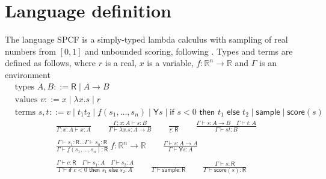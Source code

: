 \documentclass{article}
\newcommand{\tY}{\textsf{Y}}
\newcommand{\tif}[3]{\textsf{if }#1\textsf{ then }#2\textsf{ else }#3}
\newcommand{\tsample}{\textsf{sample}}
\newcommand{\tscore}{\textsf{score}}
\begin{document}
\section{Language definition}
The language SPCF is a simply-typed lambda calculus with sampling of real numbers from $[0,1]$ and unbounded scoring, following \cite{MakOP20b}. Types and terms are defined as follows, where $r$ is a real, $x$ is a variable, $f : \mathbb{R}^n \to \mathbb{R}$ and $\Gamma$ is an environment
\begin{align*}
  & \text{types } A, B ::= \textsf{R}  \mid  A \to B \\
  & \text{values } v ::= x  \mid  \lambda x.s  \mid  \underline{r} \\
  & \text{terms } s, t ::= v  \mid  t_1 t_2  \mid  \underline{f}(s_1,\dots ,s_n)  \mid  \tY s  \mid  \tif{s < 0}{t_1}{t_2}  \mid  \tsample  \mid  \tscore(s)
\end{align*}
\begin{align*}
  \frac{}{\Gamma ; x:A \vdash x:A} \qquad
  \frac{\Gamma ; x:A \vdash s : B}{\Gamma \vdash \lambda x.s : A \to B} \qquad
  \frac{}{\underline{r} : \textsf{R}} \qquad
  \frac{\Gamma \vdash s:A \to B \quad \Gamma \vdash t : A}{\Gamma \vdash s t : B} \\ \\
  \frac{\Gamma \vdash s_1:\textsf{R} \dots \Gamma \vdash s_n:\textsf{R}}{\Gamma \vdash \underline{f}(s_1,\dots,s_n) : \textsf{R}} \ f : \mathbb{R}^n \to \mathbb{R} \qquad
  \frac{\Gamma \vdash s : A \to A}{\Gamma \vdash \tY s : A} \\ \\
  \frac{\Gamma \vdash c : \textsf{R} \quad \Gamma \vdash s_1 : A \quad \Gamma \vdash s_2 : A}{\Gamma \vdash \tif{c < 0}{s_1}{s_2} : A} \qquad
  \frac{}{\Gamma \vdash \tsample : \textsf{R}} \qquad
  \frac{\Gamma \vdash s : \textsf{R}}{\Gamma \vdash \tscore (s) : \textsf{R}}
\end{align*}

\end{document}
